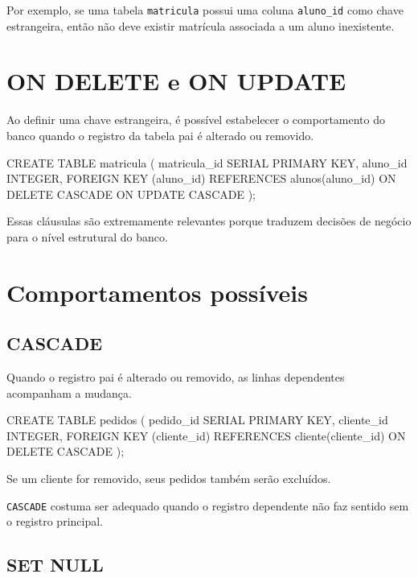 Por exemplo, se uma tabela \texttt{matricula} possui uma coluna \texttt{aluno\_id} como chave estrangeira, então não deve existir matrícula associada a um aluno inexistente.

\section{ON DELETE e ON UPDATE}

Ao definir uma chave estrangeira, é possível estabelecer o comportamento do banco quando o registro da tabela pai é alterado ou removido.

\begin{sqlcode}
CREATE TABLE matricula (
    matricula_id SERIAL PRIMARY KEY,
    aluno_id INTEGER,
    FOREIGN KEY (aluno_id)
        REFERENCES alunos(aluno_id)
        ON DELETE CASCADE
        ON UPDATE CASCADE
);
\end{sqlcode}

Essas cláusulas são extremamente relevantes porque traduzem decisões de negócio para o nível estrutural do banco.

\section{Comportamentos possíveis}

\subsection{CASCADE}

Quando o registro pai é alterado ou removido, as linhas dependentes acompanham a mudança.

\begin{sqlcode}
CREATE TABLE pedidos (
    pedido_id SERIAL PRIMARY KEY,
    cliente_id INTEGER,
    FOREIGN KEY (cliente_id)
        REFERENCES cliente(cliente_id)
        ON DELETE CASCADE
);
\end{sqlcode}

Se um cliente for removido, seus pedidos também serão excluídos.

\begin{quadro_dica}
\texttt{CASCADE} costuma ser adequado quando o registro dependente não faz sentido sem o registro principal.
\end{quadro_dica}

\subsection{SET NULL}

